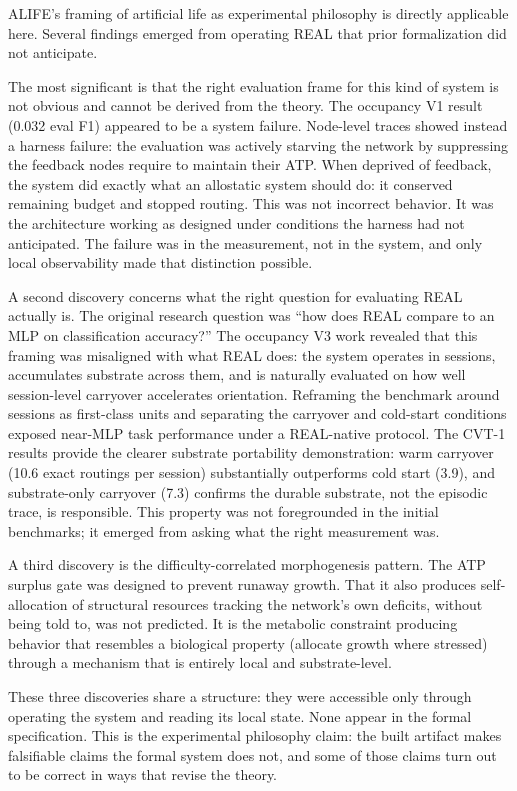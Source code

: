 \documentclass[letterpaper]{article}
\begin{document}
ALIFE's framing of artificial life as experimental philosophy is directly
applicable here. Several findings emerged from operating REAL that prior
formalization did not anticipate.

The most significant is that the right evaluation frame for this kind of system is
not obvious and cannot be derived from the theory. The occupancy V1 result
(0.032 eval F1) appeared to be a system failure. Node-level traces showed instead
a harness failure: the evaluation was actively starving the network by suppressing
the feedback nodes require to maintain their ATP. When deprived of feedback, the
system did exactly what an allostatic system should do: it conserved remaining
budget and stopped routing. This was not incorrect behavior. It was the
architecture working as designed under conditions the harness had not anticipated.
The failure was in the measurement, not in the system, and only local observability
made that distinction possible.

A second discovery concerns what the right question for evaluating REAL actually
is. The original research question was ``how does REAL compare to an MLP on
classification accuracy?'' The occupancy V3 work revealed that this framing was
misaligned with what REAL does: the system operates in sessions, accumulates
substrate across them, and is naturally evaluated on how well session-level
carryover accelerates orientation. Reframing the benchmark around sessions as
first-class units and separating the carryover and cold-start conditions exposed
near-MLP task performance under a REAL-native protocol. The CVT-1 results provide
the clearer substrate portability demonstration: warm carryover (10.6 exact
routings per session) substantially outperforms cold start (3.9), and
substrate-only carryover (7.3) confirms the durable substrate, not the episodic
trace, is responsible. This property was not foregrounded in the initial
benchmarks; it emerged from asking what the right measurement was.

A third discovery is the difficulty-correlated morphogenesis pattern. The ATP
surplus gate was designed to prevent runaway growth. That it also produces
self-allocation of structural resources tracking the network's own deficits,
without being told to, was not predicted. It is the metabolic constraint producing
behavior that resembles a biological property (allocate growth where stressed)
through a mechanism that is entirely local and substrate-level.

These three discoveries share a structure: they were accessible only through
operating the system and reading its local state. None appear in the formal
specification. This is the experimental philosophy claim: the built artifact makes
falsifiable claims the formal system does not, and some of those claims turn out to
be correct in ways that revise the theory.
\end{document}
